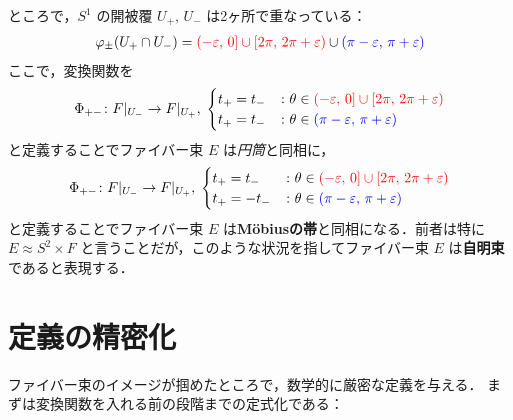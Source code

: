 \documentclass[geometry_main]{subfiles}
\begin{document}
ところで，$S^1$ の開被覆 $U_+,\, U_-$ は2ヶ所で重なっている：
\begin{align}
	\varphi_{\pm}(U_+ \cap U_-) = \textcolor{red}{(-\varepsilon,\, 0] \cup [2\pi,\, 2\pi + \varepsilon)} \cup \textcolor{blue}{(\pi-\varepsilon,\, \pi + \varepsilon)}
\end{align}
ここで，変換関数を
\begin{align}
	\Phi_{+-} \colon F|_{U_-} \to F|_{U_+},\; 
	\begin{cases}
		t_+ = t_- & \colon \theta \in \textcolor{red}{(-\varepsilon,\, 0] \cup [2\pi,\, 2\pi + \varepsilon)} \\
		t_+ = t_- &	\colon \theta \in \textcolor{blue}{(\pi-\varepsilon,\, \pi + \varepsilon)}
	\end{cases}
\end{align}
と定義することでファイバー束 $E$ は\emph{円筒}と同相に， 
\begin{align}
	\Phi_{+-} \colon F|_{U_-} \to F|_{U_+},\; 
	\begin{cases}
		t_+ = t_- & \colon \theta \in \textcolor{red}{(-\varepsilon,\, 0] \cup [2\pi,\, 2\pi + \varepsilon)} \\
		t_+ = -t_- & \colon \theta \in \textcolor{blue}{(\pi-\varepsilon,\, \pi + \varepsilon)}
	\end{cases}
\end{align}
と定義することでファイバー束 $E$ は\textbf{M\"obiusの帯}と同相になる．前者は特に $E \approx S^2 \times F$ と言うことだが，このような状況を指してファイバー束 $E$ は\textbf{自明束}であると表現する．

\section{定義の精密化}

ファイバー束のイメージが掴めたところで，数学的に厳密な定義を与える．
まずは変換関数を入れる前の段階までの定式化である：

		
\end{document}
